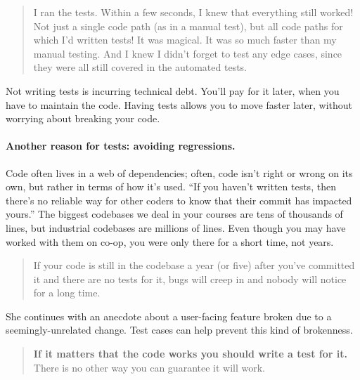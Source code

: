 \documentclass[11pt]{article}
\begin{document}
\begin{quote}
I ran the tests. Within a few seconds, I knew that everything still worked! Not just a single code path (as in a manual test), but all code paths for which I’d written tests! It was magical. It was so much faster than my manual testing. And I knew I didn’t forget to test any edge cases, since they were all still covered in the automated tests.
\end{quote}

Not writing tests is incurring technical debt. You'll pay for it
later, when you have to maintain the code. Having tests
allows you to move faster later, without worrying about breaking your
code.

\paragraph{Another reason for tests: avoiding regressions.} 
Code often lives in a web of dependencies; often, code isn't right or
wrong on its own, but rather in terms of how it's used.  ``If you
haven’t written tests, then there’s no reliable way for other coders
to know that their commit has impacted yours.''  The biggest codebases
we deal in your courses are tens of thousands of lines, but industrial
codebases are millions of lines. Even though you may have worked with
them on co-op, you were only there for a short time, not years.

\begin{quote}
If your code is still in the codebase a year (or five) after you’ve
committed it and there are no tests for it, bugs will creep in and
nobody will notice for a long time.
\end{quote}

She continues with an anecdote about a user-facing feature broken 
due to a seemingly-unrelated change. Test cases can help prevent 
this kind of brokenness.

\begin{quote}
{\bf If it matters that the code works you should write a test for it.} There is no other way you can guarantee it will work.
\end{quote}
\end{document}
